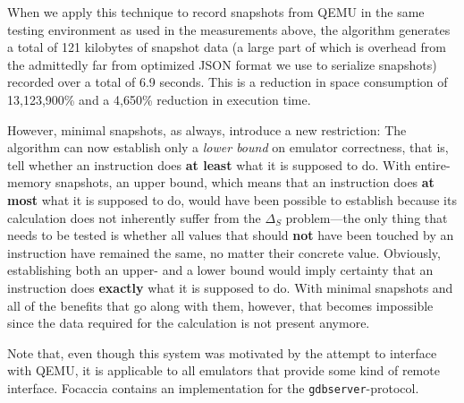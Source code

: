 When we apply this technique to record snapshots from QEMU in the same testing environment as used in the measurements
above, the algorithm generates a total of 121 kilobytes of snapshot data (a large part of which is overhead from the
admittedly far from optimized JSON format we use to serialize snapshots) recorded over a total of 6.9 seconds. This is a
reduction in space consumption of 13,123,900\% and a 4,650\% reduction in execution time.

However, minimal snapshots, as always, introduce a new restriction: The algorithm can now establish only a \textit{lower
bound} on emulator correctness, that is, tell whether an instruction does \textbf{at least} what it is supposed to do.
With entire-memory snapshots, an upper bound, which means that an instruction does \textbf{at most} what it is supposed
to do, would have been possible to establish because its calculation does not inherently suffer from the $\Delta_S$
problem---the only thing that needs to be tested is whether all values that should \textbf{not} have been touched by an
instruction have remained the same, no matter their concrete value. Obviously, establishing both an upper- and a lower
bound would imply certainty that an instruction does \textbf{exactly} what it is supposed to do. With minimal snapshots
and all of the benefits that go along with them, however, that becomes impossible since the data required for the
calculation is not present anymore.

Note that, even though this system was motivated by the attempt to interface with QEMU, it is applicable to all
emulators that provide some kind of remote interface. Focaccia contains an implementation for the
\texttt{gdbserver}-protocol.



%
%
%
